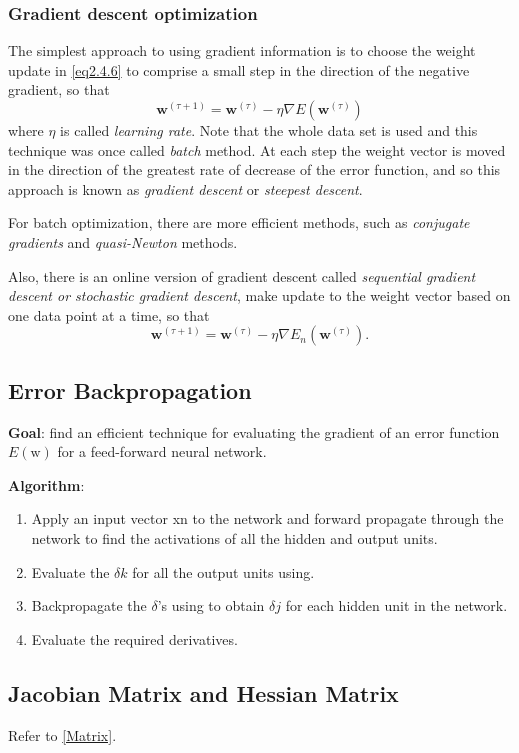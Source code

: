 \documentclass[a4paper]{book}
\newcommand{\mbf}{\mathbf}
\newcommand{\ww}{\mbf w}
\newcommand{\tit}{\textit}
\begin{document}
\subsubsection*{Gradient descent optimization}
The simplest approach to using gradient information is to choose the weight update in \ref{eq2.4.6} to comprise a small step in the direction of the negative gradient, so
that
\begin{equation}\label{}
  \ww^{(\tau+1)} =\ww^{(\tau)}-\eta\nabla E(\ww^{(\tau)})
\end{equation}
where $\eta$ is called \tit{learning rate}. Note that the whole data set is used and this technique was once called \tit{batch} method. At each step the weight vector is moved in the direction of the greatest rate of decrease of the error function, and so this approach is known as \tit{gradient descent} or \tit{steepest descent}.

For batch optimization, there are more efficient methods, such as \tit{conjugate gradients} and \tit{quasi-Newton} methods.

Also, there is an online version of gradient descent called \tit{sequential gradient descent or stochastic gradient descent}, make update to the weight vector based on one data point at a time, so that
\begin{equation}\label{}
  \ww^{(\tau+1)}=\ww^{(\tau)} -\eta\nabla E_n(\ww^{(\tau)}).
\end{equation}

\subsection{Error Backpropagation}
\textbf{Goal}: find an efficient technique for evaluating  the gradient of an error function $E(\mathrm w)$ for a feed-forward neural network.

\textbf{Algorithm}:
\begin{enumerate}
  \item Apply an input vector xn to the network and forward propagate through the network to find the activations of all the hidden and output units.
  \item Evaluate the $\delta k$ for all the output units using.
  \item Backpropagate the $\delta$’s using to obtain $\delta j$ for each hidden unit in the network.
  \item Evaluate the required derivatives.
\end{enumerate}
\subsection{Jacobian Matrix and Hessian Matrix}
Refer to \ref{Matrix}.
\end{document}
